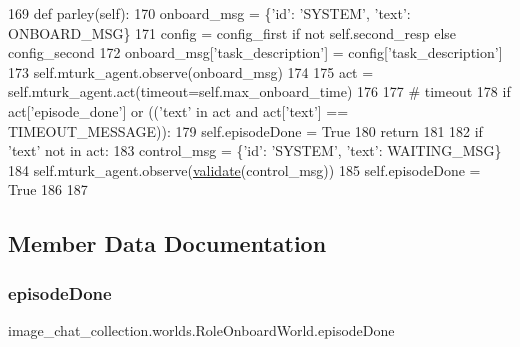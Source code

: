 \begin{DoxyCode}
169     \textcolor{keyword}{def }parley(self):
170         onboard\_msg = \{\textcolor{stringliteral}{'id'}: \textcolor{stringliteral}{'SYSTEM'}, \textcolor{stringliteral}{'text'}: ONBOARD\_MSG\}
171         config = config\_first \textcolor{keywordflow}{if} \textcolor{keywordflow}{not} self.second\_resp \textcolor{keywordflow}{else} config\_second
172         onboard\_msg[\textcolor{stringliteral}{'task\_description'}] = config[\textcolor{stringliteral}{'task\_description'}]
173         self.mturk\_agent.observe(onboard\_msg)
174 
175         act = self.mturk\_agent.act(timeout=self.max\_onboard\_time)
176 
177         \textcolor{comment}{# timeout}
178         \textcolor{keywordflow}{if} act[\textcolor{stringliteral}{'episode\_done'}] \textcolor{keywordflow}{or} ((\textcolor{stringliteral}{'text'} \textcolor{keywordflow}{in} act \textcolor{keywordflow}{and} act[\textcolor{stringliteral}{'text'}] == TIMEOUT\_MESSAGE)):
179             self.episodeDone = \textcolor{keyword}{True}
180             \textcolor{keywordflow}{return}
181 
182         \textcolor{keywordflow}{if} \textcolor{stringliteral}{'text'} \textcolor{keywordflow}{not} \textcolor{keywordflow}{in} act:
183             control\_msg = \{\textcolor{stringliteral}{'id'}: \textcolor{stringliteral}{'SYSTEM'}, \textcolor{stringliteral}{'text'}: WAITING\_MSG\}
184             self.mturk\_agent.observe(\hyperlink{namespaceparlai_1_1core_1_1worlds_afc3fad603b7bce41dbdc9cdc04a9c794}{validate}(control\_msg))
185             self.episodeDone = \textcolor{keyword}{True}
186 
187 
\end{DoxyCode}


\subsection{Member Data Documentation}
\mbox{\label{classimage__chat__collection_1_1worlds_1_1RoleOnboardWorld_a5f75149b8c759e83c23b1e39ed2d5dbb}} 
\subsubsection{\texorpdfstring{episode\+Done}{episodeDone}}
{\footnotesize\ttfamily image\+\_\+chat\+\_\+collection.\+worlds.\+Role\+Onboard\+World.\+episode\+Done}



